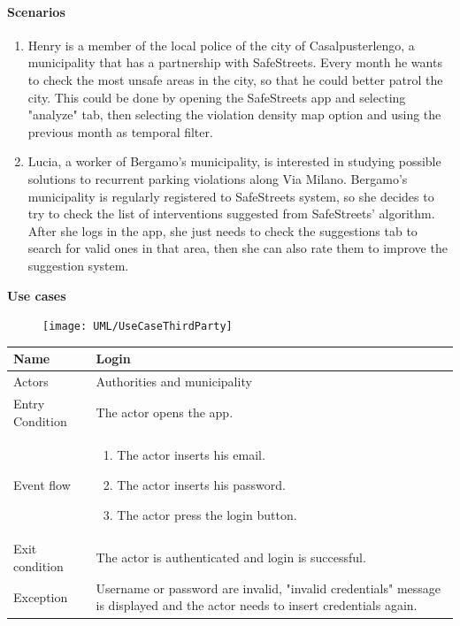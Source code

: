 \paragraph{Scenarios}
\begin{enumerate}
    \item Henry is a member of the local police of the city of Casalpusterlengo, a municipality that has a partnership with SafeStreets. Every month he wants to check the most unsafe areas in the city, so that he could better patrol the city. This could be done by opening the SafeStreets app and selecting "analyze" tab, then selecting the violation density map option and using the previous month as temporal filter.
    
    \item Lucia, a worker of Bergamo's municipality, is interested in studying possible solutions to recurrent parking violations along Via Milano. Bergamo's municipality is regularly registered to SafeStreets system, so she decides to try to check the list of interventions suggested from SafeStreets' algorithm. After she logs in the app, she just needs to check the suggestions tab to search for valid ones in that area, then she can also rate them to improve the suggestion system.
\end{enumerate}
\textbf{Use cases}
\begin{figure}[H]
        \centering
        \texttt{[image: UML/UseCaseThirdParty]}
\end{figure}

\vskip 0.2in
\begin{tabular}{|p{3.1cm}|p{11.6cm}|}
\hline
Name & Login\\
\hline
Actors & Authorities and municipality\\
\hline
Entry Condition & The actor opens the app.\\
\hline
Event flow & \begin{enumerate}
                \item The actor inserts his email.
                \item The actor inserts his password.
                \item The actor press the login button.
            \end{enumerate}\\
\hline
Exit condition & The actor is authenticated and login is successful.\\
\hline
Exception & Username or password are invalid, "invalid credentials" message is displayed and the actor needs to insert credentials again.\\
\hline
\end{tabular}

